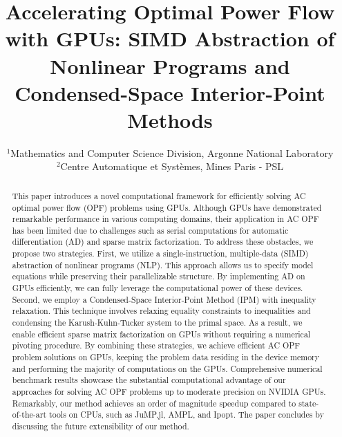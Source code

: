 % 
\title{Accelerating Optimal Power Flow with GPUs: SIMD Abstraction of Nonlinear Programs and Condensed-Space Interior-Point Methods 
}

\author{
  \and
}

\date{\small
  $^{1}$Mathematics and Computer Science Division, Argonne National Laboratory\\
  $^{2}$Centre Automatique et Syst\`{e}mes, Mines Paris - PSL
}

\maketitle
\begin{abstract}
  This paper introduces a novel computational framework for efficiently
  solving AC optimal power flow (OPF) problems using GPUs. Although GPUs
  have demonstrated remarkable performance in various computing domains,
  their application in AC OPF has been limited due to challenges such as
  serial computations for automatic differentiation (AD) and sparse matrix
  factorization. To address these obstacles, we propose two strategies.
  First, we utilize a single-instruction, multiple-data (SIMD)
  abstraction of nonlinear programs (NLP). This approach allows us to
  specify model equations while preserving their parallelizable
  structure. By implementing AD on GPUs
  efficiently, we can fully leverage the computational power of these
  devices.  Second, we employ a Condensed-Space Interior-Point Method
  (IPM) with inequality relaxation. This technique involves relaxing
  equality constraints to inequalities and condensing the
  Karush-Kuhn-Tucker system to the primal space. As a result, we enable
  efficient sparse matrix factorization on GPUs without requiring a
  numerical pivoting procedure.  By combining these strategies, we
  achieve efficient AC OPF problem solutions on GPUs, keeping the
  problem data residing in the device memory and performing the majority
  of computations on the GPUs. Comprehensive numerical benchmark results
  showcase the substantial computational advantage of our approaches for
  solving AC OPF problems up to moderate precision on NVIDIA
  GPUs. Remarkably, our method achieves an order of magnitude speedup
  compared to state-of-the-art tools on CPUs, such as JuMP.jl, AMPL, and
  Ipopt. The paper concludes by discussing the future extensibility of
  our method.
\end{abstract}


